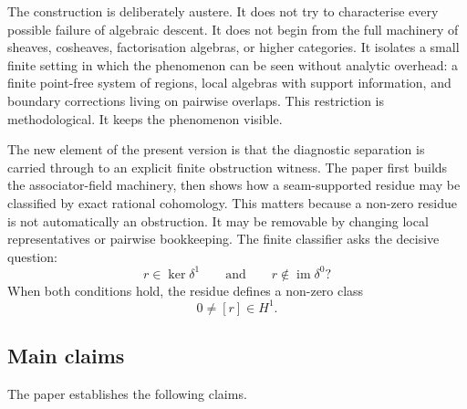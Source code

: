 \documentclass[11pt]{article}
\newcommand{\im}{\operatorname{im}}
\begin{document}
The construction is deliberately austere. It does not try to characterise every possible failure of algebraic descent. It does not begin from the full machinery of sheaves, cosheaves, factorisation algebras, or higher categories. It isolates a small finite setting in which the phenomenon can be seen without analytic overhead: a finite point-free system of regions, local algebras with support information, and boundary corrections living on pairwise overlaps. This restriction is methodological. It keeps the phenomenon visible.

The new element of the present version is that the diagnostic separation is carried through to an explicit finite obstruction witness. The paper first builds the associator-field machinery, then shows how a seam-supported residue may be classified by exact rational cohomology. This matters because a non-zero residue is not automatically an obstruction. It may be removable by changing local representatives or pairwise bookkeeping. The finite classifier asks the decisive question:
\[
r\in \ker \delta^1
\qquad\text{and}\qquad
r\notin \im \delta^0?
\]
When both conditions hold, the residue defines a non-zero class
\[
0\neq [r]\in H^1.
\]

\subsection{Main claims}

The paper establishes the following claims.
\end{document}
